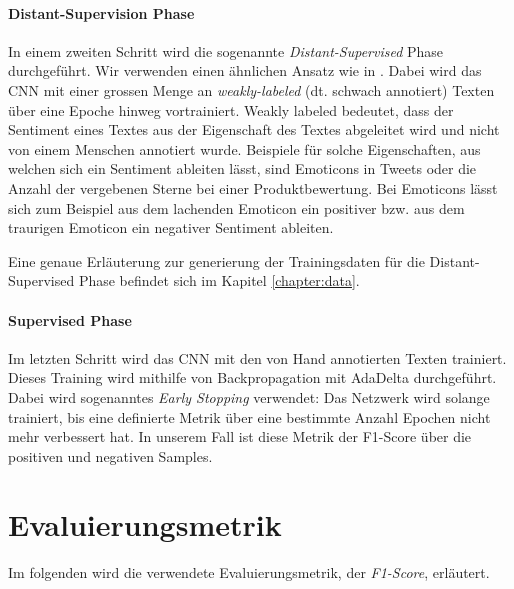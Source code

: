 \paragraph{Distant-Supervision Phase} In einem zweiten Schritt wird die sogenannte \emph{Distant-Supervised} Phase durchgeführt. Wir verwenden einen ähnlichen Ansatz wie in \cite{Go:2009}. Dabei wird das CNN mit einer grossen Menge an \emph{weakly-labeled} (dt. schwach annotiert) Texten über eine Epoche hinweg vortrainiert. Weakly labeled bedeutet, dass der Sentiment eines Textes aus der Eigenschaft des Textes abgeleitet wird und nicht von einem Menschen annotiert wurde. Beispiele für solche Eigenschaften, aus welchen sich ein Sentiment ableiten lässt, sind Emoticons in Tweets oder die Anzahl der vergebenen Sterne bei einer Produktbewertung. Bei Emoticons lässt sich zum Beispiel aus dem lachenden Emoticon \quotes{:-)} ein positiver bzw. aus dem traurigen Emoticon \quotes{:-(} ein negativer Sentiment ableiten.

Eine genaue Erläuterung zur generierung der Trainingsdaten für die Distant-Supervised Phase befindet sich im Kapitel \ref{chapter:data}.

\paragraph{Supervised Phase} Im letzten Schritt wird das CNN mit den von Hand annotierten Texten trainiert. Dieses Training wird mithilfe von Backpropagation mit AdaDelta durchgeführt. Dabei wird sogenanntes \emph{Early Stopping} verwendet: Das Netzwerk wird solange trainiert, bis eine definierte Metrik über eine bestimmte Anzahl Epochen nicht mehr verbessert hat. In unserem Fall ist diese Metrik der F1-Score über die positiven und negativen Samples.

\section{Evaluierungsmetrik}
Im folgenden wird die verwendete Evaluierungsmetrik, der \emph{F1-Score}, erläutert.

